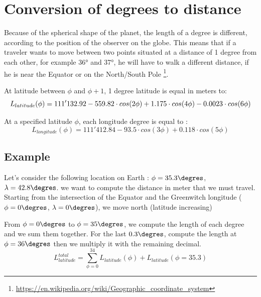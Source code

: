 \documentclass[12pt,a4paper]{article}
\begin{document}
\newpage
\section{Conversion of degrees to distance}
Because of the spherical shape of the planet, the length of a degree is different, according to the position of the observer on the globe. This means that  
if a traveler wants to move between two points situated at a distance of 1 degree from each other, for example 36° and 37°, he will have to walk a different distance, if he is near the Equator or on the North/South Pole \footnote{\url{https://en.wikipedia.org/wiki/Geographic_coordinate_system}}.


At latitude between $\phi$ and $\phi+1$, 1 degree latitude is equal in meters to:
\begin{dmath}
	L_{latitude}(\phi) = 111'132.92-559.82 \cdot cos(2 \phi) + 1.175 \cdot cos(4\phi) \\ -0.0023 \cdot cos(6\phi)
\end{dmath}

At a specified latitude $\phi$, each longitude degree is equal to : 
\begin{dmath}
	L_{longitude}(\phi) =
111'412.84-93.5 \cdot cos(3\phi)+ 0.118 \cdot cos(5\phi)
\end{dmath}
\subsection{Example}

Let's consider the following location on Earth : $\phi = 35.3\degres$,  $\lambda = 42.8\degres$.
we want to compute the distance in meter that we must travel.
Starting from the intersection of the Equator and the Greenwitch longitude ($\phi = 0\degres$,  $\lambda = 0\degres$), we move north (latitude increasing)

From $\phi = 0\degres$ to $\phi = 35\degres$, we compute the length of each degree and we sum them together. For the last $0.3\degres$, compute the length at $\phi = 36\degres$ then we multiply it with the remaining decimal.
\begin{equation}
	L_{latitude}^{total} = \sum_{\phi=0}^{34}  L_{latitude}(\phi) + L_{latitude}(\phi=35.3)
\end{equation}
\end{document}
